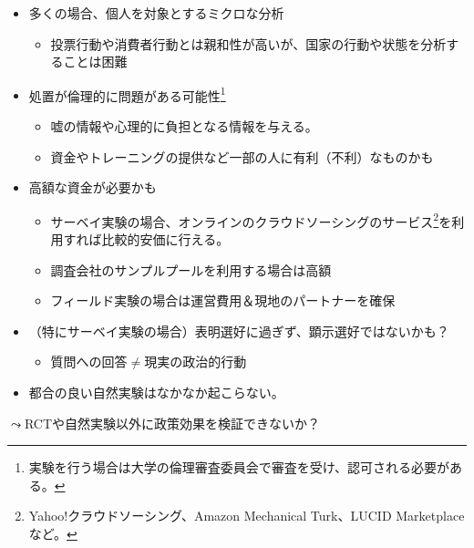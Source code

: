 \documentclass[
  xelatex,
  ja=standard]{bxjsarticle}
\providecommand{\tightlist}{%
  \setlength{\itemsep}{0pt}\setlength{\parskip}{0pt}}\usepackage{longtable,booktabs,array}
\begin{document}
\begin{itemize}
\tightlist
\item
  多くの場合、個人を対象とするミクロな分析

  \begin{itemize}
  \tightlist
  \item
    投票行動や消費者行動とは親和性が高いが、国家の行動や状態を分析することは困難
  \end{itemize}
\item
  処置が倫理的に問題がある可能性\footnote{実験を行う場合は大学の倫理審査委員会で審査を受け、認可される必要がある。}

  \begin{itemize}
  \tightlist
  \item
    嘘の情報や心理的に負担となる情報を与える。
  \item
    資金やトレーニングの提供など一部の人に有利（不利）なものかも
  \end{itemize}
\item
  高額な資金が必要かも

  \begin{itemize}
  \tightlist
  \item
    サーベイ実験の場合、オンラインのクラウドソーシングのサービス\footnote{Yahoo!クラウドソーシング、Amazon
      Mechanical Turk、LUCID Marketplaceなど。}を利用すれば比較的安価に行える。
  \item
    調査会社のサンプルプールを利用する場合は高額
  \item
    フィールド実験の場合は運営費用＆現地のパートナーを確保
  \end{itemize}
\item
  （特にサーベイ実験の場合）表明選好に過ぎず、顕示選好ではないかも？

  \begin{itemize}
  \tightlist
  \item
    質問への回答\(\neq\)現実の政治的行動
  \end{itemize}
\item
  都合の良い自然実験はなかなか起こらない。
\end{itemize}

\(\leadsto\)RCTや自然実験以外に政策効果を検証できないか？


  
\end{document}
